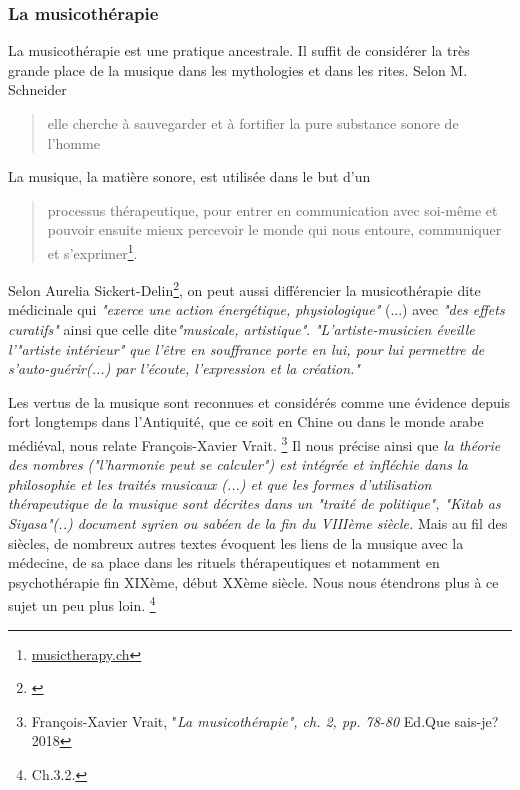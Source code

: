  



\subsubsection{La musicothérapie}
La musicothérapie est une pratique ancestrale. Il suffit de considérer la très grande  place de la musique dans les mythologies et dans les rites.  Selon M. Schneider
\begin{quote}
	elle cherche à sauvegarder et à fortifier la pure substance sonore de l'homme\autocite[Voir tome I, pp. 202--203]%
	[M. Schneider, <<\,Le rôle  de la musique dans la mythologie et les rites des civilisations non européennes\,>>]{schaeffner.ea:histoire}
\end{quote}

La musique, la matière sonore, est utilisée dans le but d'un 
\begin{quote}
	processus thérapeutique, pour entrer en communication avec soi-même et pouvoir ensuite mieux percevoir le monde qui nous
	entoure, communiquer et s'exprimer\footnote{%
		\href{http://www.musictherapy.ch/fr/musicotherapie/quest-ce-que-la-musicotherapie/}{musictherapy.ch}}.
\end{quote}

 Selon Aurelia Sickert-Delin\footnote{\autocite[ch. 1,  p. 14, du texte inédit communiqué par son auteur à J.Viret]{viret:b}}, on peut aussi différencier la musicothérapie dite médicinale qui \emph{"exerce une action énergétique, physiologique" }(...) avec \emph{"des effets curatifs"}  ainsi que celle dite\emph{"musicale, artistique"}. 
 	 \emph{"L'artiste-musicien éveille l'"artiste intérieur" que l'être en souffrance porte en lui, pour lui permettre de s'auto-guérir(...) par l'écoute, l'expression et la création."}
 	 
 	 
Les vertus de la musique sont reconnues et considérés comme une évidence depuis fort longtemps dans l'Antiquité, que ce soit en Chine ou dans le monde arabe médiéval, nous relate François-Xavier Vrait.
 \footnote{François-Xavier Vrait, "\textit{La musicothérapie", ch. 2, pp. 78-80} Ed.Que sais-je? 2018} 
 Il nous précise ainsi que \emph{ la théorie des nombres ("l'harmonie peut se calculer") est intégrée et infléchie dans la philosophie et les traités musicaux (...) et que les formes d'utilisation thérapeutique de la musique sont décrites dans un "traité de politique", "Kitab as Siyasa"(..) document syrien ou sabéen de la fin du VIIIème siècle.} Mais au fil des siècles, de nombreux autres textes évoquent les liens de la musique avec la médecine, de sa place dans les rituels thérapeutiques et notamment en psychothérapie fin XIXème, début XXème siècle. Nous nous étendrons plus à ce sujet un peu plus loin. \footnote{Ch.3.2.}
 
